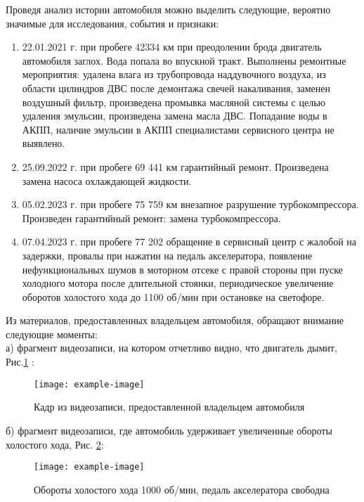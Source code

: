 \pagebreak

\noindent Проведя анализ истории автомобиля  можно выделить следующие, вероятно  значимые для исследования, события и признаки:
\begin{enumerate}
\item  
22.01.2021 г. при пробеге 42334 км  при преодолении брода двигатель автомобиля заглох. Вода попала во впускной тракт. Выполнены ремонтные мероприятия: удалена влага из трубопровода наддувочного воздуха, из области цилиндров ДВС после демонтажа свечей накаливания, заменен воздушный фильтр, произведена промывка масляной системы с целью удаления эмульсии, произведена замена масла ДВС. Попадание воды в АКПП, наличие эмульсии в АКПП специалистами сервисного центра не выявлено.
\item 
25.09.2022 г. при пробеге 69 441 км гарантийный ремонт.  Произведена замена насоса охлаждающей жидкости.
\item 
05.02.2023 г. при пробеге 75 759 км внезапное разрушение турбокомпрессора. Произведен гарантийный ремонт: замена турбокомпрессора.
\item 
07.04.2023 г. при пробеге 77 202 обращение в сервисный центр с жалобой на задержки, провалы при нажатии на педаль акселератора, появление нефункциональных шумов в моторном отсеке с правой стороны при пуске холодного мотора после длительной стоянки, периодическое увеличение оборотов холостого хода до 1100 об/мин при остановке на светофоре.
\end{enumerate}
\vspace{5mm}
Из материалов, предоставленных владельцем автомобиля, обращают внимание следующие моменты:\\
а) фрагмент видеозаписи, на котором отчетливо видно, что двигатель дымит, Рис.\ref{dimit} :\\

\begin{figure}[H]
	\centering
	\texttt{[image: example-image]}
	\caption{Кадр из видеозаписи, предоставленной владельцем автомобиля}
	\label{dimit}
\end{figure}
б) фрагмент видеозаписи, где автомобиль удерживает увеличенные обороты  холостого хода, Рис. \ref{fig:1000}:

\begin{figure}[H]
	\centering
	\texttt{[image: example-image]}
	\caption{Обороты холостого хода 1000 об/мин, педаль акселератора свободна}
	\label{fig:1000}
\end{figure}

